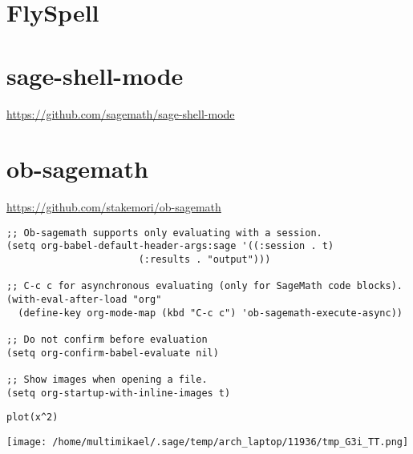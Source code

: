 \documentclass[11pt]{article}
\begin{document}
\section{FlySpell}
\label{sec-7}

\section{sage-shell-mode}
\label{sec-8}
\url{https://github.com/sagemath/sage-shell-mode}

\section{ob-sagemath}
\label{sec-9}
\url{https://github.com/stakemori/ob-sagemath}

\begin{verbatim}
;; Ob-sagemath supports only evaluating with a session.
(setq org-babel-default-header-args:sage '((:session . t)
					   (:results . "output")))

;; C-c c for asynchronous evaluating (only for SageMath code blocks).
(with-eval-after-load "org"
  (define-key org-mode-map (kbd "C-c c") 'ob-sagemath-execute-async))

;; Do not confirm before evaluation
(setq org-confirm-babel-evaluate nil)

;; Show images when opening a file.
(setq org-startup-with-inline-images t)
\end{verbatim}

\begin{verbatim}
plot(x^2)
\end{verbatim}

\texttt{[image: /home/multimikael/.sage/temp/arch\_laptop/11936/tmp\_G3i\_TT.png]}
\end{document}
